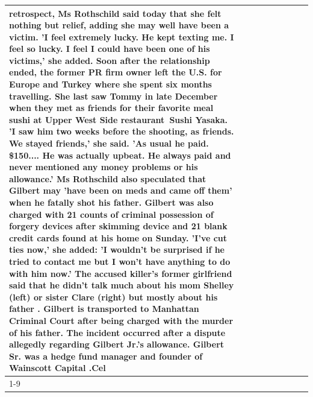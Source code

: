 \begin{table}[H]
\begin{tabular}{lllrlllll}
retrospect, Ms Rothschild said today that she felt nothing but relief, adding she may well have been a victim. 'I feel extremely lucky. He kept texting me. I feel so lucky. I feel I could have been one of his victims,' she added. Soon after the relationship ended, the former PR firm owner left the U.S. for Europe and Turkey where she spent six months  travelling. She last saw Tommy in late December when they met as friends for their favorite meal sushi at Upper West Side restaurant Sushi Yasaka. 'I saw him two weeks before the shooting, as friends. We stayed friends,' she said. 'As usual he paid. \$150.... He was actually upbeat. He always paid and never mentioned any money problems or his allowance.' Ms Rothschild also speculated that Gilbert may 'have been on meds and came off them' when he fatally shot his father. Gilbert was also charged with 21 counts of criminal possession of forgery devices after skimming device and 21 blank credit cards found at his home on Sunday. 'I've cut ties now,' she added: 'I wouldn’t be surprised if he tried to contact me but I won’t have anything to do with him now.' The accused killer's former girlfriend said that he didn't talk much about his mom Shelley (left) or sister Clare (right) but mostly about his father . Gilbert is transported to Manhattan Criminal Court  after being charged with the murder of his father. The incident occurred after a dispute allegedly regarding Gilbert Jr.'s allowance. Gilbert Sr. was a hedge fund manager and founder of Wainscott Capital .Cel \\
\cline{1-9} \cline{2-9}

\end{tabular}
\end{table}
